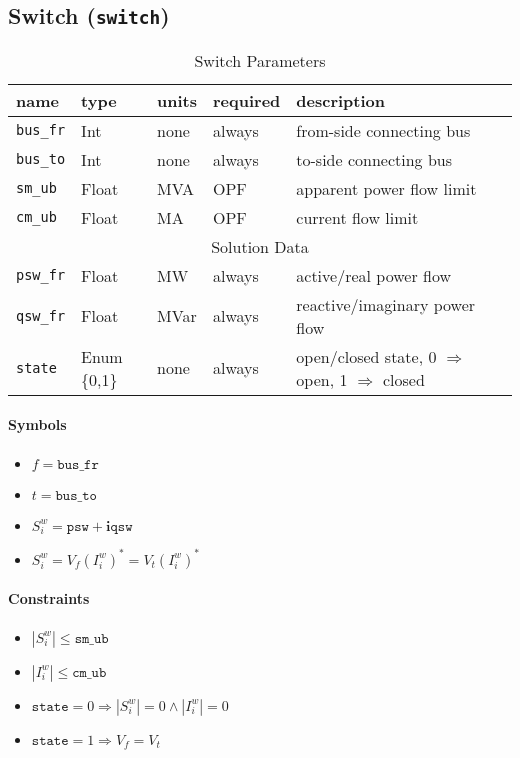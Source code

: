 \documentclass{article}
\begin{document}
\subsection{Switch (\texttt{switch})}


\begin{table}[h]
\centering
\caption{Switch Parameters}
\begin{tabular}{|l|l|l|l|p{7cm}|}
\hline
name & type & units & required & description \\ 
\hline
\hline
\texttt{bus\_fr} & Int & none & always & from-side connecting bus \\ 
\hline
\texttt{bus\_to} & Int & none & always & to-side connecting bus \\ 
\hline
\texttt{sm\_ub} & Float & MVA & OPF & apparent power flow limit \\ 
\hline
\texttt{cm\_ub} & Float & MA & OPF & current flow limit \\ 
\hline
\hline
\multicolumn{5}{|c|}{Solution Data} \\
\hline
\texttt{psw\_fr} & Float & MW & always & active/real power flow \\ 
\hline
\texttt{qsw\_fr} & Float & MVar & always & reactive/imaginary power flow \\ 
\hline
\texttt{state} & Enum \{0,1\} & none & always & open/closed state, 0 $\Rightarrow$ open, 1 $\Rightarrow$ closed\\ 
\hline
\end{tabular}
\label{tbl:tbd}
\end{table}

\paragraph{Symbols}
\begin{itemize}
    \item $f = \texttt{bus\_fr}$
    \item $t = \texttt{bus\_to}$
    \item $S^w_i = \texttt{psw} + \bm i \texttt{qsw}$
    \item $S^w_i = V_f( I^w_i )^*= V_t( I^w_i)^* $
\end{itemize}

\paragraph{Constraints}
\begin{itemize}
    \item $|S^w_i| \leq \texttt{sm\_ub}$
    \item $|I^w_i| \leq \texttt{cm\_ub}$
    \item $\texttt{state} = 0 \Rightarrow |S^w_i| = 0 \wedge |I^w_i| = 0$
    \item $\texttt{state} = 1 \Rightarrow V_f = V_t$
\end{itemize}
\end{document}
